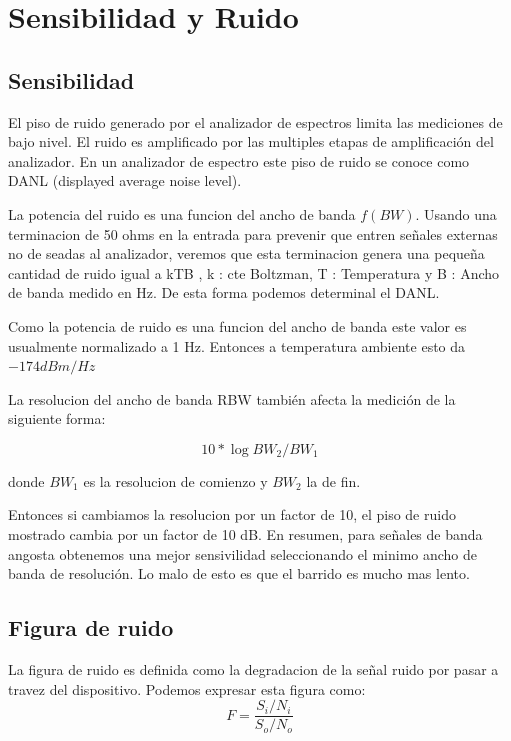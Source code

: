 \documentclass[a4paper,12pt,twoside]{article}
\begin{document}


\newpage

\section{Sensibilidad y Ruido}
\subsection{Sensibilidad}
El piso de ruido generado por el analizador de espectros limita las mediciones de bajo nivel. El ruido es amplificado por las multiples etapas de amplificación del analizador. En un analizador de espectro este piso de ruido se conoce como DANL (displayed average noise level). 

La potencia del ruido es una funcion del ancho de banda $f(BW)$. Usando una terminacion de 50 ohms en la entrada para prevenir que entren señales externas no de seadas al analizador, veremos que esta terminacion genera una pequeña cantidad de ruido igual a kTB , k : cte Boltzman, T : Temperatura y B : Ancho de banda medido en Hz. De esta forma podemos determinal el DANL. \newline

Como la potencia de ruido es una funcion del ancho de banda este valor es usualmente normalizado a 1 Hz. Entonces a temperatura ambiente esto da $-174 dBm/Hz$

La resolucion del ancho de banda RBW también afecta la medición de la siguiente forma:\newline

\begin{equation}
10*\log{BW_{2}/BW_{1}}
\label{BW}
\end{equation} 

 donde $BW_1$ es la resolucion de comienzo y $BW_2$ la de fin.\newline

Entonces si cambiamos la resolucion por un factor de 10, el piso de ruido mostrado cambia por un factor de 10 dB. En resumen, para señales de banda angosta obtenemos una mejor sensivilidad seleccionando el minimo ancho de banda de resolución. Lo malo de esto es que el barrido es mucho mas lento.

\subsection{Figura de ruido}
La figura de ruido es definida como la degradacion de la señal ruido por pasar a travez del dispositivo. Podemos expresar esta figura como:
\begin{equation*}
F=\frac{S_i/N_i}{S_o/N_o}
\end{equation*}
\end{document}
